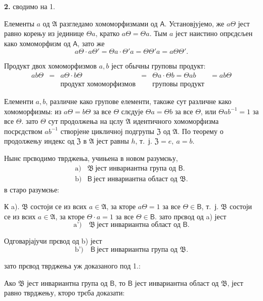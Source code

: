 \documentclass[11pt]{article}
\begin{document}
\textbf{2.} сводимо на 1.

Елементы \(a\) од \(\mathfrak A\) разгледамо хомоморфизмами од \(\mathsf A\). Установјујемо, же \(a\Theta\) јест равно корењу из јединице \(\Theta a\), кратко \(a\Theta=\Theta a\). Тым \(a\) јест наистино опрєдєљен како хомоморфизм од \(\mathsf A\), зато же
\[
a\Theta\cdot a\Theta'=\Theta a\cdot\Theta' a=\Theta\Theta' a=a\Theta\Theta'.
\]

Продукт двох хомоморфизмов \(a,b\) јест обычны груповы продукт:
\[
\begin{array}{cccccc}
ab\Theta&=&a\Theta\cdot b\Theta&=&\Theta a\cdot\Theta b=\Theta ab&=ab\Theta\\
&&\text{продукт хомоморфизмов}&&\text{груповы продукт}&
\end{array}
\]

Елементи \(a,b\), различне како групове елементи, такоже сут различне како хомоморфизмы: из \(a\Theta=b\Theta\) за все \(\Theta\) слєдује \(\Theta a=\Theta b\) за все \(\Theta\), или \(\Theta ab^{-1}=1\) за все \(\Theta\). зато \(\Theta\) сут продолжења на цєлу \(\mathfrak A\) идентичного хомоморфизма посрєдством \(ab^{-1}\) створјене цикличној подгрупы \(\mathfrak Z\) од \(\mathfrak A\). По теорему о продолжењу индекс од \(\mathfrak Z\) в \(\mathfrak A\) јест равны \(h\), т.~ј. \(\mathfrak Z=e,\ a=b\).

Нынє прєводимо тврджења, учињена в новом разумєњу,
\[
\begin{array}{ll}
\text{a)}& \mathfrak B\ \text{јест инвариантна група од }\mathsf B.\\
\text{b)}& \mathsf B\ \text{јест инвариантна област од }\mathfrak B.
\end{array}
\]
в старо разумєње:

К a). \(\mathfrak B\) состоји се из всих \(a\in\mathfrak A\), за кторе \(a\Theta=1\) за все \(\Theta\in\mathsf B\), т.~ј. \(\mathfrak B\) состоји се из всих \(a\in\mathfrak A\), за кторе \(\Theta\cdot a=1\) за все \(\Theta\in\mathsf B\). зато прєвод од a) јест
\[
\text{a')} \quad \mathfrak B\ \text{јест инвариантна област од }\mathsf B.
\]

Одговарјајучи прєвод од b) јест
\[
\text{b')} \quad \mathsf B\ \text{јест инвариантна група од }\mathfrak B.
\]

зато прєвод тврджења уж доказаного под 1.:

Ако \(\mathfrak B\) јест инвариантна група од \(\mathsf B\), то \(\mathsf B\) јест инвариантна област од \(\mathfrak B\),
јест равно тврджењу, кторо трєба доказати:
\end{document}
